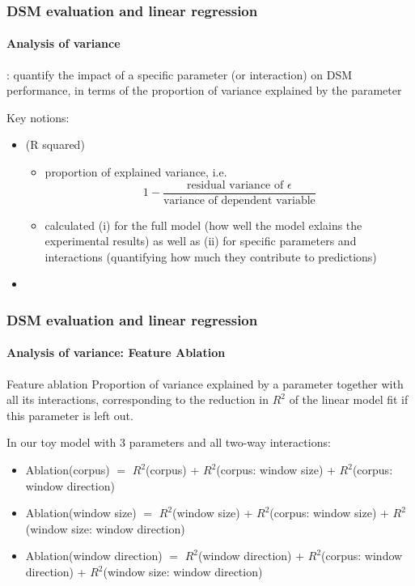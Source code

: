 \documentclass[t]{beamer} %
\begin{document}
\begin{frame}
  \frametitle{DSM evaluation and linear regression}
  \framesubtitle{Analysis of variance}

  \begin{block}{}\footnotesize
    : quantify the impact of a specific parameter (or interaction) on DSM performance, in terms of the proportion of variance explained by the parameter
  \end{block}

  \footnotesize
  Key notions:
  \begin{itemize}
  \item {} (R squared)
    \begin{itemize}\footnotesize
    \item proportion of explained variance, i.e.\
      \[
      1 - \frac{\text{residual variance of $\epsilon$}}{\text{variance of dependent variable}}
      \]
    \item calculated (i) for the full model (\so how well the model exlains the experimental results) as well as (ii) for specific parameters and interactions (quantifying how much they contribute to predictions)
    \end{itemize}
  \item  {}

  \end{itemize}
\end{frame}

\begin{frame}
  \frametitle{DSM evaluation and linear regression}
  \framesubtitle{Analysis of variance: Feature Ablation}

  \begin{block}{Feature ablation}
    Proportion of variance explained by a parameter together with all its interactions, corresponding to the reduction in  $R^2$ of the linear model fit if this parameter is left out. 
  \end{block}

  In our toy model with 3 parameters and all two-way interactions: 

  \begin{itemize}\footnotesize
  \item Ablation(corpus) $=$  $R^2$(corpus) +  $R^2$(corpus: window size) +  $R^2$(corpus: window direction)  
  \item Ablation(window size) $=$  $R^2$(window size) +  $R^2$(corpus: window size) +  $R^2$(window size: window direction)
  \item Ablation(window direction) $=$  $R^2$(window direction) +  $R^2$(corpus: window direction) +  $R^2$(window size: window direction) 
  \end{itemize}

\end{frame}
\end{document}
